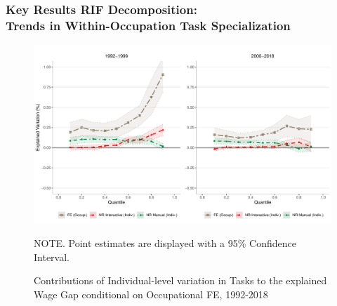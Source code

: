\documentclass[10pt]{beamer}
\begin{document}
\begin{frame}[label=wi_spec]
	\frametitle{Key Results RIF Decomposition: \\ Trends in Within-Occupation Task Specialization}
	
	\begin{figure}[H]
		\begin{minipage}{0.95\textwidth} %
			\centering
			\includegraphics[scale=0.32]{rif_wi_nrinrm}
			\caption{Contributions of Individual-level variation in Tasks to the explained Wage Gap conditional on Occupational FE, 1992-2018 \label{fig:wgap_subs} \label{fig:wage_gap_base}}
			{\footnotesize \tiny NOTE. \textemdash  Point estimates are displayed with a 95\% Confidence Interval. \par}
		\end{minipage}
	\end{figure}
	
	
	
	
\end{frame}




\end{document}
